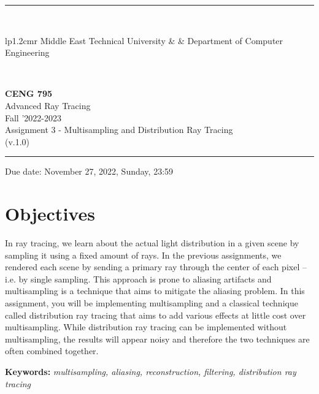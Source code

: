 \documentclass[12pt]{article}
\newcommand{\HRule}{\rule{\linewidth}{1mm}}
\begin{document}
\noindent \HRule \\[3mm]
\small
\begin{tabular}[b]{lp{1.2cm}r}
\href{https://www.metu.edu.tr/}{} Middle East Technical
University &  &
\href{https://ceng.metu.edu.tr/information}{} Department of Computer Engineering \\
\end{tabular} \\
\begin{center}

                 \LARGE \textbf{CENG 795} \\[4mm]
                 \Large Advanced Ray Tracing \\[4mm]
                \normalsize Fall '2022-2023 \\
                    \normalsize Assignment 3 - Multisampling and Distribution Ray Tracing \\
                    \normalsize (v.1.0)
\end{center}
\HRule

\begin{center}
Due date: November 27, 2022, Sunday, 23:59
\end{center}


\section{Objectives}

In ray tracing, we learn about the actual light distribution in a given
scene by sampling it using a fixed amount of rays. In the previous
assignments, we rendered each scene by sending a primary ray through the
center of each pixel -- i.e. by single sampling. This approach is prone
to aliasing artifacts and multisampling is a technique that aims to
mitigate the aliasing problem. In this assignment, you will be
implementing multisampling and a classical technique called distribution
ray tracing that aims to add various effects at little cost over
multisampling. While distribution ray tracing can be implemented
without multisampling, the results will appear noisy and therefore the
two techniques are often combined together.

\vspace{0.5cm} \noindent \textbf{Keywords:} \emph{multisampling,
    aliasing, reconstruction, filtering, distribution ray tracing}
\end{document}
